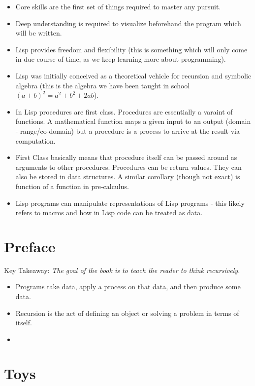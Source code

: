 \documentclass[11pt]{article}
\begin{document}
\begin{itemize}
\item Core skills are the first set of things required to master any pursuit.
\item Deep understanding is required to visualize beforehand the program which will be written.
\item Lisp provides freedom and flexibility (this is something which will only come in due course of time, as we keep
learning more about programming).
\item Lisp was initially conceived as a theoretical vehicle for recursion and symbolic algebra (this is the algebra we
have been taught in school \((a + b)^2 = a^2 + b^2 + 2ab\)).
\item In Lisp procedures are first class. Procedures are essentially a varaint of functions. A mathematical function maps
a given input to an output (domain - range/co-domain) but a procedure is a process to arrive at the result via
computation.
\item First Class basically means that procedure itself can be passed around as arguments to other procedures. Procedures
can be return values. They can also be stored in data structures. A similar corollary (though not exact) is
function of a function in pre-calculus.
\item Lisp programs can manipulate representations of Lisp programs - this likely refers to macros and how in Lisp code can
be treated as data.
\end{itemize}

\newpage
\section{Preface}
\label{sec:org5d21ec7}

Key Takeaway:
\emph{The goal of the book is to teach the reader to think recursively.}

\vspace{1em}

\begin{itemize}
\item Programs take data, apply a process on that data, and then produce some data.
\item Recursion is the act of defining an object or solving a problem in terms of itself.
\item 
\end{itemize}

\section{Toys}
\label{sec:org4a27f38}
\end{document}

